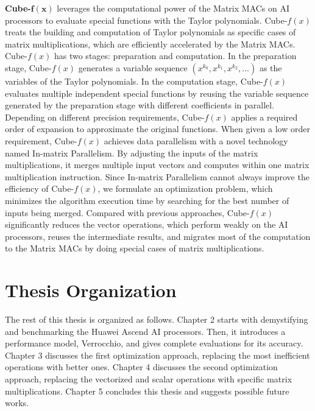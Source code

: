 \documentclass[12pt]{extbook}
\begin{document}
\textbf{Cube-}$\mathbf{f(x)}$ leverages the computational power of the Matrix MACs on AI processors to evaluate special functions with the Taylor polynomials. Cube-${f(x)}$ treats the building and computation of Taylor polynomials as specific cases of matrix multiplications, which are efficiently accelerated by the Matrix MACs. Cube-${f(x)}$ has two stages: preparation and computation. In the preparation stage, Cube-${f(x)}$ generates a variable sequence $(x^{k_0}, x^{k_1}, x^{k_2}, ...)$ as the variables of the Taylor polynomials. In the computation stage, Cube-${f(x)}$ evaluates multiple independent special functions by reusing the variable sequence generated by the preparation stage with different coefficients in parallel. Depending on different precision requirements, Cube-${f(x)}$ applies a required order of expansion to approximate the original functions. When given a low order requirement, Cube-${f(x)}$ achieves data parallelism with a novel technology named In-matrix Parallelism. By adjusting the inputs of the matrix multiplications, it merges multiple input vectors and computes within one matrix multiplication instruction. Since In-matrix Parallelism cannot always improve the efficiency of Cube-${f(x)}$, we formulate an optimization problem, which minimizes the algorithm execution time by searching for the best number of inputs being merged. Compared with previous approaches, Cube-${f(x)}$ significantly reduces the vector operations, which perform weakly on the AI processors, reuses the intermediate results, and migrates most of the computation to the Matrix MACs by doing special cases of matrix multiplications.

\section{Thesis Organization}
\label{sec_1_4_organization}

The rest of this thesis is organized as follows. Chapter 2 starts with demystifying and benchmarking the Huawei Ascend AI processors. Then, it introduces a performance model, Verrocchio, and gives complete evaluations for its accuracy. Chapter 3 discusses the first optimization approach, replacing the most inefficient operations with better ones. Chapter 4 discusses the second optimization approach, replacing the vectorized and scalar operations with specific matrix multiplications. Chapter 5 concludes this thesis and suggests possible future works.

\end{document}
